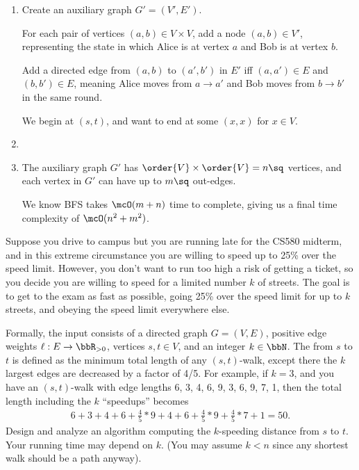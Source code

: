 \documentclass{article}
\begin{document}
\begin{solution}

\begin{enumerate}[label=(\alph*)]
  \item Create an auxiliary graph $G' = (V', E')$.

  For each pair of vertices $(a,b) \in V \times V$, add a node $(a,b) \in V'$, representing the state in which Alice is at vertex $a$ and Bob is at vertex $b$.

  Add a directed edge from $(a,b)$ to $(a',b')$ in $E'$ iff $(a, a') \in E$ and $(b, b') \in E$, meaning Alice moves from $a \to a'$ and Bob moves from $b \to b'$ in the same round.

  We begin at $(s,t)$, and want to end at some $(x, x)$ for $ x\in V $.

  \item {}

  \item The auxiliary graph $ G' $ has $ \order{V}\times\order{V}=n\sq $ vertices, and each vertex in $ G' $ can have up to $ m\sq $ out-edges.

  We know BFS takes $\mcO(m+n)$ time to complete, giving us a final time complexity of $\mcO(n^2 + m^2)$.
\end{enumerate}
\end{solution}
\pagebreak

\setcounter{exercise}{2}
\begin{exercise}
  Suppose you drive to campus but you are running late for the CS580 midterm, and in this extreme circumstance you are willing to speed up to 25\% over the speed limit.
  However, you don't want to run too high a risk of getting a ticket, so you decide you are willing to speed for a limited number $ k $ of streets.
  The goal is to get to the exam as fast as possible, going 25\% over the speed limit for up to $ k $ streets, and obeying the speed limit everywhere else.

  Formally, the input consists of a directed graph $G = (V, E)$, positive edge weights $ \ell:E\to \bbR_{>0} $, vertices $ s,t\in V $, and an integer $k \in \bbN$.
  The  from $s$ to $t$ is defined as the minimum total length of any $(s, t)$-walk, except there the $ k $ largest edges are decreased by a factor of 4/5.
  For example, if $k = 3$, and you have an $(s, t)$-walk with edge lengths 6, 3, 4, 6, 9, 3, 6, 9, 7, 1, then the total length including the $ k $ ``speedups'' becomes \begin{align*}
    6+3+4+6+\frac{4}{5}*9+4+6+\frac{4}{5}*9+\frac{4}{5}*7+1=50.
  \end{align*}
  Design and analyze an algorithm computing the $k$-speeding distance from $ s $ to $t$.
  Your running time may depend on $ k $. (You may assume $ k < n $ since any shortest walk should be a path anyway).
\end{exercise}
\end{document}
